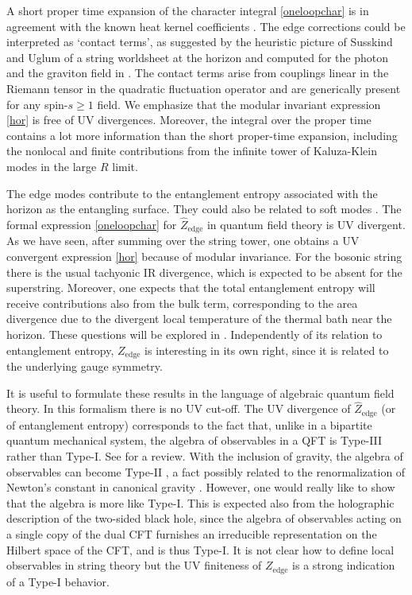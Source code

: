 \documentclass[aps,prl, reprint, superscriptaddress, 10pt]{revtex4-2}
\newcommand{\1}{\textbf{1}}
\newcommand{\+}{{\,+ \,}}
\begin{document}
A short proper time expansion of the character integral \eqref{oneloopchar} is in agreement with the known heat kernel coefficients \cite{Vassilevich:2003xt}. The edge corrections could be interpreted as `contact terms', as suggested by the heuristic picture of Susskind and Uglum \cite{Susskind:1994sm} of a string worldsheet at the horizon and computed for the photon and the graviton field in \cite{Kabat:1995eq,David:2022jfd,Blommaert:2024cal}. The contact terms arise from couplings linear in the Riemann tensor in the quadratic fluctuation operator and are generically present for any spin-$s\geq1$ field. We emphasize that the modular invariant expression \eqref{hor} is free of UV divergences. Moreover, the integral over the proper time contains a lot more information than the short proper-time expansion, including the nonlocal and finite contributions from the infinite tower of Kaluza-Klein modes in the large $R$ limit.

The edge modes contribute to the entanglement entropy associated with the horizon as the entangling surface. They could also be related to soft modes \cite{Anninos:2021ihe}. The formal expression \eqref{oneloopchar} for $\hat{Z}_{\text{edge}}$ in quantum field theory is UV divergent. As we have seen, after summing over the string tower, one obtains a UV convergent expression \eqref{hor} because of modular invariance. For the bosonic string there is the usual tachyonic IR divergence, which is expected to be absent for the superstring. Moreover, one expects that the total entanglement entropy will receive contributions also from the bulk term, corresponding to the area divergence due to the divergent local temperature of the thermal bath near the horizon. These questions will be explored in \cite{Dabholkar:2026WiP}. Independently of its relation to entanglement entropy, $Z_{\text{edge}}$ is interesting in its own right, since it is related to the underlying gauge symmetry.

It is useful to formulate these results in the language of algebraic quantum field theory. In this formalism there is no UV cut-off. The UV divergence of $\hat Z_{\text{edge}}$ (or of entanglement entropy) corresponds to the fact that, unlike in a bipartite quantum mechanical system, the algebra of observables in a QFT is Type-III rather than Type-I. See \cite{Witten:2018zxz} for a review. With the inclusion of gravity, the algebra of observables can become Type-II \cite{Witten:2021unn, Chandrasekaran:2022cip}, a fact possibly related to the renormalization of Newton's constant in canonical gravity \cite{Susskind:1994sm}. However, one would really like to show that the algebra is more like Type-I. This is expected also from the holographic description of the two-sided black hole, since the algebra of observables acting on a single copy of the dual CFT furnishes an irreducible representation on the Hilbert space of the CFT, and is thus Type-I. It is not clear how to define local observables in string theory but the UV finiteness of $Z_{\text{edge}}$ is a strong indication of a Type-I behavior.
\end{document}
